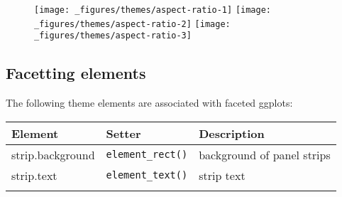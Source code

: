 \begin{figure}[H]
  \texttt{[image: \_figures/themes/aspect-ratio-1]}%
  \texttt{[image: \_figures/themes/aspect-ratio-2]}%
  \texttt{[image: \_figures/themes/aspect-ratio-3]}
\end{figure}

\subsection{Facetting elements}

 

The following theme elements are associated with faceted ggplots:

\begin{longtable}[c]{@{}lll@{}}
\toprule
\begin{minipage}[b]{0.27\columnwidth}\raggedright\strut
Element
\strut\end{minipage} &
\begin{minipage}[b]{0.24\columnwidth}\raggedright\strut
Setter
\strut\end{minipage} &
\begin{minipage}[b]{0.47\columnwidth}\raggedright\strut
Description
\strut\end{minipage}\tabularnewline
\midrule
\endhead
\begin{minipage}[t]{0.27\columnwidth}\raggedright\strut
strip.background
\strut\end{minipage} &
\begin{minipage}[t]{0.24\columnwidth}\raggedright\strut
\texttt{element\_rect()}
\strut\end{minipage} &
\begin{minipage}[t]{0.47\columnwidth}\raggedright\strut
background of panel strips
\strut\end{minipage}\tabularnewline
\begin{minipage}[t]{0.27\columnwidth}\raggedright\strut
strip.text
\strut\end{minipage} &
\begin{minipage}[t]{0.24\columnwidth}\raggedright\strut
\texttt{element\_text()}
\strut\end{minipage} &
\begin{minipage}[t]{0.47\columnwidth}\raggedright\strut
strip text
\strut\end{minipage}\tabularnewline
\begin{minipage}[t]{0.27\columnwidth}\raggedright\strut

\end{minipage}
\end{longtable}
